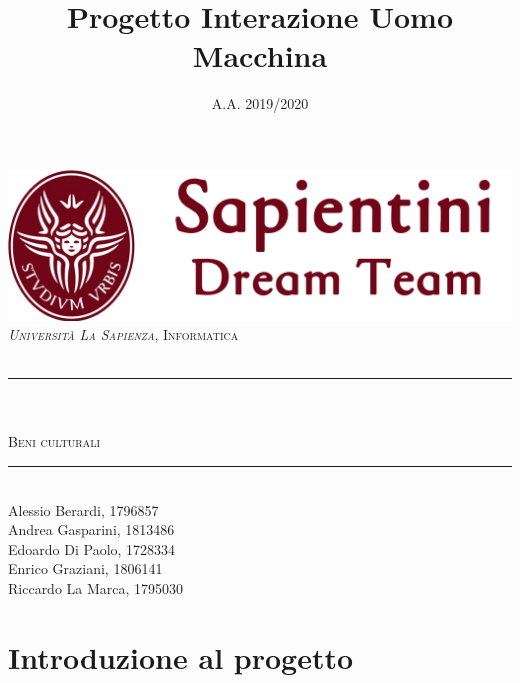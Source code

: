 \documentclass[12pt]{article}
\title{Progetto Interazione Uomo Macchina}
\date{A.A. 2019/2020}
\makeatletter
\def\projectName{Beni culturali}
\let\documentTitle\@title
\let\academicYear\@date
\makeatother
\begin{document}
\begin{titlepage}
	\centering
    \vspace*{0.5 cm}
    \includegraphics{logosapientini.png}\\[0.75 cm]
	\textsc{\textit{Università La Sapienza}, Informatica}\\[0.25 cm]
	\textsc{\academicYear}\\[0.5 cm]
	\rule{\linewidth}{0.2 mm} \\[0.4 cm]
	\textsc{\large \documentTitle}\\[0.4 cm]
	\textsc{\Huge \projectName}\\
	\rule{\linewidth}{0.2 mm} \\[1.5 cm]
	
	\large
	Alessio Berardi, 1796857\\[0.2 cm]
	Andrea Gasparini, 1813486\\[0.2 cm]
    Edoardo Di Paolo, 1728334\\[0.2 cm]
    Enrico Graziani, 1806141\\[0.2 cm]
    Riccardo La Marca, 1795030\\[0.2 cm]
\end{titlepage}

\tableofcontents
\pagebreak

\section{Introduzione al progetto}



\end{document}
